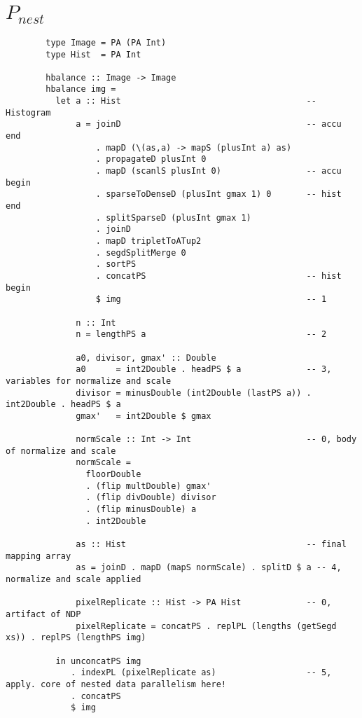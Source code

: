 \documentclass{article}
\newcommand{\ndpn}[0]{$P_{nest}$}
\begin{document}
    \section{\ndpn}
      \begin{lstlisting}
        type Image = PA (PA Int)
        type Hist  = PA Int

        hbalance :: Image -> Image
        hbalance img =
          let a :: Hist                                     -- Histogram
              a = joinD                                     -- accu end
                  . mapD (\(as,a) -> mapS (plusInt a) as)
                  . propagateD plusInt 0
                  . mapD (scanlS plusInt 0)                 -- accu begin
                  . sparseToDenseD (plusInt gmax 1) 0       -- hist end
                  . splitSparseD (plusInt gmax 1)
                  . joinD
                  . mapD tripletToATup2
                  . segdSplitMerge 0
                  . sortPS
                  . concatPS                                -- hist begin
                  $ img                                     -- 1
                      
              n :: Int
              n = lengthPS a                                -- 2
              
              a0, divisor, gmax' :: Double
              a0      = int2Double . headPS $ a             -- 3, variables for normalize and scale
              divisor = minusDouble (int2Double (lastPS a)) . int2Double . headPS $ a
              gmax'   = int2Double $ gmax
              
              normScale :: Int -> Int                       -- 0, body of normalize and scale
              normScale =
                floorDouble
                . (flip multDouble) gmax'
                . (flip divDouble) divisor
                . (flip minusDouble) a
                . int2Double
              
              as :: Hist                                    -- final mapping array
              as = joinD . mapD (mapS normScale) . splitD $ a -- 4, normalize and scale applied
              
              pixelReplicate :: Hist -> PA Hist             -- 0, artifact of NDP
              pixelReplicate = concatPS . replPL (lengths (getSegd xs)) . replPS (lengthPS img)
              
          in unconcatPS img
             . indexPL (pixelReplicate as)                  -- 5, apply. core of nested data parallelism here!
             . concatPS
             $ img
      \end{lstlisting}
    
\end{document}
